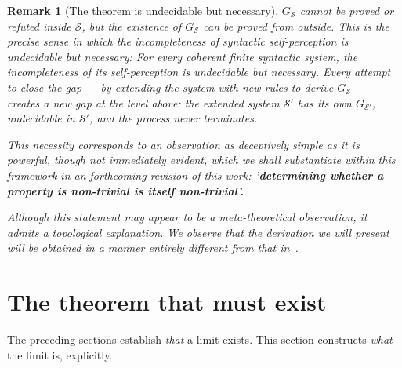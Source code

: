 \documentclass[11pt]{article}
\newtheorem{remark}[theorem]{Remark}
\begin{document}
\begin{remark}[The theorem is undecidable but necessary]
$G_{\mathcal{S}}$ cannot be proved or refuted inside $\mathcal{S}$, but
the \emph{existence} of $G_{\mathcal{S}}$ can be proved from outside.
This is the precise sense in which the incompleteness of syntactic
self-perception is undecidable but necessary: For every coherent finite 
syntactic system, the incompleteness of its self-perception is undecidable 
but necessary. Every attempt to close the gap --- by extending the system with new
rules to derive $G_{\mathcal{S}}$ --- creates a new gap at the level
above: the extended system $\mathcal{S}'$ has its own
$G_{\mathcal{S}'}$, undecidable in $\mathcal{S}'$, and the process
never terminates.

\bigskip

This necessity corresponds to an observation as deceptively simple as it is powerful, 
though not immediately evident, which we shall substantiate within this framework 
in an forthcoming revision of this work: {\bfseries 'determining whether a property is non-trivial 
is itself non-trivial'.} 
\medskip


Although this statement may appear to be a meta-theoretical observation, 
it admits a topological explanation. We observe that the derivation we 
will present will be obtained in a manner entirely different from 
that in~\cite{buono2026limitsuniformcertificationstandard}.

\end{remark}





\section{The theorem that must exist}
\label{sec:must-exist}


The preceding sections establish \emph{that} a limit exists. This
section constructs \emph{what} the limit is, explicitly.
\end{document}
